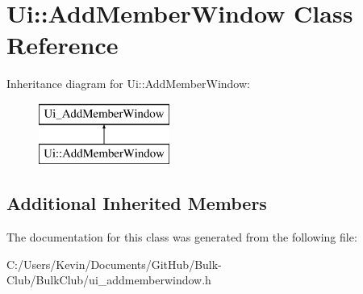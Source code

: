 \hypertarget{class_ui_1_1_add_member_window}{}\section{Ui\+:\+:Add\+Member\+Window Class Reference}
\label{class_ui_1_1_add_member_window}
Inheritance diagram for Ui\+:\+:Add\+Member\+Window\+:\begin{figure}[H]
\begin{center}
\leavevmode
\includegraphics[height=2.000000cm]{class_ui_1_1_add_member_window}
\end{center}
\end{figure}
\subsection*{Additional Inherited Members}


The documentation for this class was generated from the following file\+:\begin{DoxyCompactItemize}
\item 
C\+:/\+Users/\+Kevin/\+Documents/\+Git\+Hub/\+Bulk-\/\+Club/\+Bulk\+Club/ui\+\_\+addmemberwindow.\+h\end{DoxyCompactItemize}
